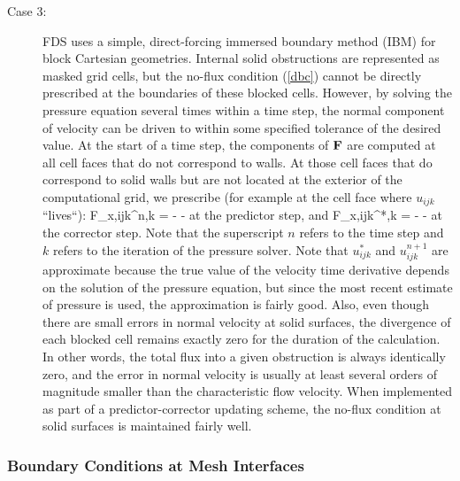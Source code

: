 \begin{description}
\item[Case 3:] FDS uses a simple, direct-forcing immersed boundary method (IBM) \cite{Fadlun:2000} for block Cartesian geometries. Internal solid obstructions are represented as masked grid cells, but the no-flux condition (\ref{dbc}) cannot be directly prescribed at the boundaries of these blocked cells. However, by solving the pressure equation several times within a time step, the normal component of velocity can be driven to within some specified tolerance of the desired value. At the start of a time step, the components of ${\mathbf{F}}$ are computed at all cell faces that do not correspond to walls. At those cell faces that do correspond to solid walls but are not located at the exterior of the computational grid, we prescribe (for example at the cell face where $u_{ijk}$ ``lives``): \be F_{x,ijk}^{n,k} = -  - \label{sbc} \ee at the predictor step, and \be F_{x,ijk}^{*,k} = -  -  \label{sbcc} \ee at the corrector step. Note that the superscript $n$ refers to the time step and $k$ refers to the iteration of the pressure solver. Note that $u_{ijk}^*$ and $u_{ijk}^{n+1}$ are approximate because the true value of the velocity time derivative depends on the solution of the pressure equation, but since the most recent estimate of pressure is used, the approximation is fairly good. Also, even though there are small errors in normal velocity at solid surfaces, the divergence of each blocked cell remains exactly zero for the duration of the calculation. In other words, the total flux into a given obstruction is always identically zero, and the error in normal velocity is usually at least several orders of magnitude smaller than the characteristic flow velocity. When implemented as part of a predictor-corrector updating scheme, the no-flux condition at solid surfaces is maintained fairly well.
\end{description}


\subsubsection{Boundary Conditions at Mesh Interfaces}
\label{section:mesh_interface}


